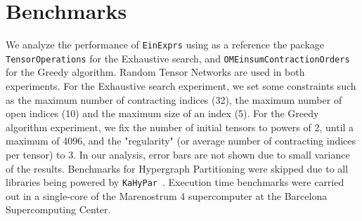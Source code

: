 \documentclass{juliacon}
\begin{document}

\section{Benchmarks}\label{sec:benchmarks}
We analyze the performance of \texttt{EinExprs} using as a reference the package \texttt{TensorOperations} for the Exhaustive search, and \texttt{OMEinsumContractionOrders} for the Greedy algorithm.
Random Tensor Networks are used in both experiments.
For the Exhaustive search experiment, we set some constraints such as the maximum number of contracting indices (32), the maximum number of open indices (10) and the maximum size of an index (5).
For the Greedy algorithm experiment, we fix the number of initial tensors to powers of 2, until a maximum of 4096, and the "regularity" (or average number of contracting indices per tensor) to 3.
In our analysis, error bars are not shown due to small variance of the results.
Benchmarks for Hypergraph Partitioning were skipped due to all libraries being powered by \texttt{KaHyPar}~\cite{10.1145/3529090}.
Execution time benchmarks were carried out in a single-core of the Marenostrum 4 supercomputer at the Barcelona Supercomputing Center.
\end{document}
